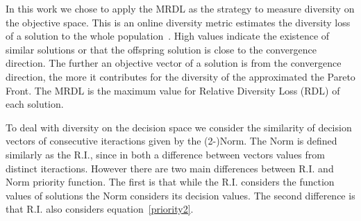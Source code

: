 In this work we chose to apply the MRDL as the strategy to measure diversity on the objective space. This is an online diversity metric estimates the diversity loss of a solution to the whole population~\cite{gee2015online}. High values indicate the existence of similar solutions or that the offspring solution is close to the convergence direction. The further an objective vector of a solution is from the convergence direction, the more it contributes for the diversity of the approximated the Pareto Front. The MRDL is the maximum value for Relative Diversity Loss (RDL) of each solution.

To deal with diversity on the decision space we consider the similarity of decision vectors of consecutive iteractions given by the (2-)Norm. The Norm is defined similarly as the R.I., since in both a difference between vectors values from distinct iteractions. However there are two main differences between R.I. and Norm priority function. The first is that while the R.I. considers the function values of solutions the Norm considers its decision values. The second difference is that R.I. also considers equation~\ref{priority2}.